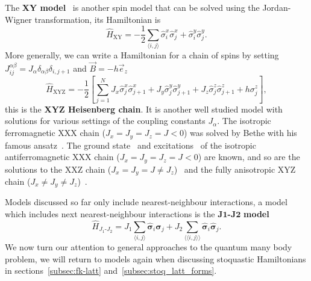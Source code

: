 The \textbf{XY model}~\cite{lieb1961two} is another spin model that can be solved using the Jordan-Wigner transformation, its Hamiltonian is
\begin{equation}
	\label{eq:h-xy}
\hat H_{\text{XY}}=-\frac{1}{2} \sum_{\langle i, j\rangle} \hat\sigma_{i}^{x} \hat\sigma_{j}^{x}+\hat\sigma_{i}^{y} \hat\sigma_{j}^{y}.
\end{equation}
More generally, we can write a Hamiltonian for a chain of spins by setting $J_{i j}^{\alpha \beta} = J_\alpha \delta_{\alpha \beta} \delta_{i, j+1}$ and $\vec{B} = -h \vec{e}_z$
\begin{equation}
	\label{eq:h-xyz}
	\hat H_{\text{XYZ}}= -\frac{1}{2}\left[ \sum_{j=1}^{N}J_{x} \hat \sigma_{j}^{x} \hat \sigma_{j+1}^{x}+J_{y} \hat \sigma_{j}^{y} \hat \sigma_{j+1}^{y}+J_{z} \hat \sigma_{j}^{z} \hat \sigma_{j+1}^{z} + h \sigma_{j}^{z}
	\right],
\end{equation}
this is the \textbf{XYZ Heisenberg chain}. It is another well studied model with solutions for various settings of the coupling constants $J_\alpha$. The isotropic ferromagnetic XXX chain ($J_x = J_y = J_z = J < 0$) was solved by Bethe with his famous ansatz~\cite{bethe1931theorie}. The ground state~\cite{hulthen1938austauschproblem} and excitations~\cite{des1962spin} of the isotropic antiferromagnetic XXX chain ($J_x = J_y = J_z = J < 0$) are known, and so are the solutions to the XXZ chain ($J_x = J_y = J \neq J_z$)~\cite{yang1966three, yang1966one, yang1966two} and the fully anisotropic XYZ chain ($J_x \neq J_y \neq J_z$)~\cite{baxter1972one}. 

Models discussed so far only include nearest-neighbour interactions, a model which includes next nearest-neighbour interactions is the $\mathbf{J1}$\textbf{-}$\mathbf{J2}$ \textbf{model}
\begin{equation}
	\label{eq:h-j1j2}
	\hat H_{J_1\text{-}J_2} = J_1 \sum_{\langle i, j \rangle} \mathbf{\hat \sigma}_i \mathbf{\hat \sigma}_j + J_2 \sum_{\langle\langle i, j \rangle\rangle} \mathbf{\hat \sigma}_i \mathbf{\hat \sigma}_j.
\end{equation}
We now turn our attention to general approaches to the quantum many body problem, we will return to models again when discussing stoquastic Hamiltonians in sections~\ref{subsec:fk-latt} and~\ref{subsec:stoq_latt_forms}.

